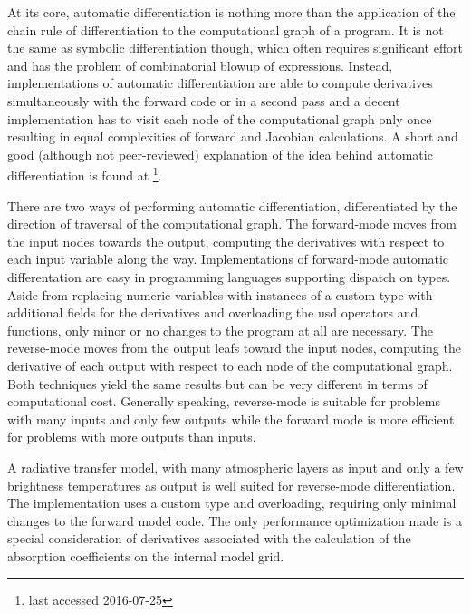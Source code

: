     At its core, automatic differentiation is nothing more than the application
    of the chain rule of differentiation to the computational graph of
    a program. It is not the same as symbolic differentiation though, which
    often requires significant effort and has the problem of combinatorial
    blowup of expressions. Instead, implementations of automatic
    differentiation are able to compute derivatives simultaneously with the
    forward code or in a second pass and a decent implementation has to visit
    each node of the computational graph only once resulting in equal
    complexities of forward and Jacobian calculations. A short and good
    (although not peer-reviewed) explanation of the idea behind automatic
    differentiation is found at
    \footnote{last accessed 2016-07-25}.

    There are two ways of performing automatic differentiation, differentiated
    by the direction of traversal of the computational graph. The forward-mode
    moves from the input nodes towards the output, computing the derivatives
    with respect to each input variable along the way. Implementations of
    forward-mode automatic differentation are easy in programming languages
    supporting dispatch on types. Aside from replacing numeric variables with
    instances of a custom type with additional fields for the derivatives and
    overloading the usd operators and functions, only minor or no changes to
    the program at all are necessary. The reverse-mode moves from the output
    leafs toward the input nodes, computing the derivative of each output with
    respect to each node of the computational graph. Both techniques yield the
    same results but can be very different in terms of computational cost.
    Generally speaking, reverse-mode is suitable for problems with many inputs
    and only few outputs while the forward mode is more efficient for problems
    with more outputs than inputs.

    A radiative transfer model, with many atmospheric layers as input and only
    a few brightness temperatures as output is well suited for reverse-mode
    differentiation. The implementation uses a custom type and overloading,
    requiring only minimal changes to the forward model code. The only
    performance optimization made is a special consideration of derivatives
    associated with the calculation of the absorption coefficients on the 
    internal model grid.

\stopsubsection

